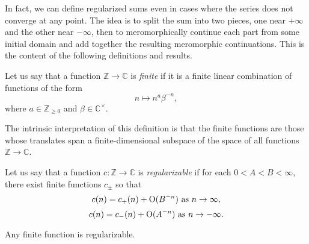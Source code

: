 \documentclass[reqno]{amsart} 
\begin{document}
In fact, we can define regularized sums even in cases where the series does not converge at any point.  The idea is to split the sum into two pieces, one near $+\infty$ and the other near $-\infty$, then to meromorphically continue each part from some initial domain and add together the resulting meromorphic continuations.  This is the content of the following definitions and results.
\begin{definition}
  Let us say that a function $\mathbb{Z} \rightarrow \mathbb{C}$ is \emph{finite} if it is a finite linear combination of functions of the form
  \begin{equation*}
    n \mapsto n^a \beta^{- n},
  \end{equation*}
  where $a \in \mathbb{Z}_{\geq 0}$ and $\beta \in \mathbb{C}^\times$.
\end{definition}
\begin{remark}
The intrinsic interpretation of this definition is that the finite functions are those whose translates span a finite-dimensional subspace of the space of all functions $\mathbb{Z} \rightarrow \mathbb{C}$.
\end{remark}
\begin{definition}
  Let us say that a function $c : \mathbb{Z} \rightarrow \mathbb{C}$ is \emph{regularizable} if for each $0 < A < B < \infty$, there exist finite functions $c_{\pm}$ so that
  \begin{equation*}
    c(n) = c_+(n) + \operatorname{O}(B^{-n}) \text{ as } n \rightarrow \infty,
  \end{equation*}
  \begin{equation*}
    c(n) = c_-(n) + \operatorname{O}(A^{-n}) \text{ as } n \rightarrow -\infty.
  \end{equation*}
\end{definition}
\begin{example}
Any finite function is regularizable.
\end{example}
\end{document}
